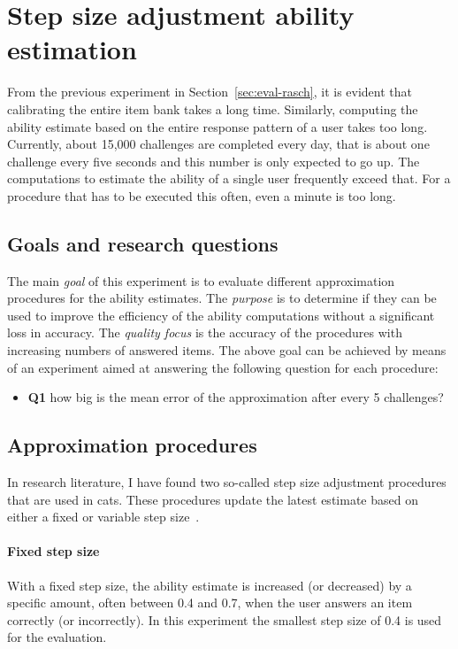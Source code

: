 \section{Step size adjustment ability estimation}
\label{sec:eval-stepsize}

From the previous experiment in Section~\ref{sec:eval-rasch}, it is evident that calibrating the entire item bank takes a long time.
Similarly, computing the ability estimate based on the entire response pattern of a user takes too long.
Currently, about 15,000 challenges are completed every day, that is about one challenge every five seconds and this number is only expected to go up.
The computations to estimate the ability of a single user frequently exceed that.
For a procedure that has to be executed this often, even a minute is too long.

\subsection{Goals and research questions}
The main \textit{goal} of this experiment is to evaluate different approximation procedures for the ability estimates.
The \textit{purpose} is to determine if they can be used to improve the efficiency of the ability computations without a significant loss in accuracy.
The \textit{quality focus} is the accuracy of the procedures with increasing numbers of answered items.
The above goal can be achieved by means of an experiment aimed at answering the following question for each procedure:
\begin{itemize}
    \item \textbf{Q1} how big is the mean error of the approximation after every 5 challenges?
\end{itemize}

\subsection{Approximation procedures}
In research literature, I have found two so-called step size adjustment procedures that are used in \glspl{cat}.
These procedures update the latest estimate based on either a fixed or variable step size~\cite{dodd1995computerized}.

\paragraph{Fixed step size} With a fixed step size, the ability estimate is increased (or decreased) by a specific amount, often between 0.4 and 0.7, when the user answers an item correctly (or incorrectly).
In this experiment the smallest step size of 0.4 is used for the evaluation.

